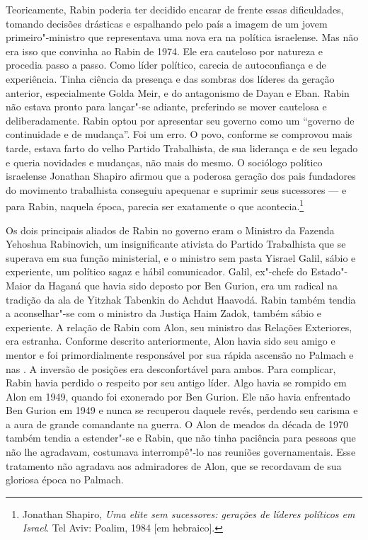 Teoricamente, Rabin poderia ter decidido encarar de frente essas
dificuldades, tomando decisões drásticas e espalhando pelo país a imagem
de um jovem primeiro"-ministro que representava uma nova era na política
israelense. Mas não era isso que convinha ao Rabin de 1974. Ele era
cauteloso por natureza e procedia passo a passo. Como líder político,
carecia de autoconfiança e de experiência. Tinha ciência da presença e
das sombras dos líderes da geração anterior, especialmente Golda Meir, e
do antagonismo de Dayan e Eban. Rabin não estava pronto para lançar"-se
adiante, preferindo se mover cautelosa e deliberadamente. Rabin optou
por apresentar seu governo como um ``governo de continuidade e de
mudança''. Foi um erro. O povo, conforme se comprovou mais tarde,
estava farto do velho Partido Trabalhista, de sua liderança e de seu
legado e queria novidades e mudanças, não mais do mesmo. O sociólogo
político israelense Jonathan Shapiro afirmou que a poderosa geração dos
pais fundadores do movimento trabalhista conseguiu apequenar e suprimir
seus sucessores --- e para Rabin, naquela época, parecia ser exatamente o
que acontecia.\footnote{Jonathan Shapiro, \emph{Uma elite sem sucessores: gerações de líderes políticos em Israel}. Tel Aviv: Poalim, 1984 {[}em hebraico{]}.}

Os dois principais aliados de Rabin no governo eram o Ministro da
Fazenda Yehoshua Rabinovich, um insignificante ativista do Partido
Trabalhista que se superava em sua função ministerial, e o ministro sem
pasta Yisrael Galil, sábio e experiente, um político sagaz e hábil
comunicador. Galil, ex"-chefe do Estado"-Maior da Haganá que havia sido
deposto por Ben Gurion, era um radical na tradição da ala de Yitzhak
Tabenkin do Achdut Haavodá. Rabin também tendia a aconselhar"-se com o
ministro da Justiça Haim Zadok, também sábio e experiente. A relação de
Rabin com Alon, seu ministro das Relações Exteriores, era estranha.
Conforme descrito anteriormente, Alon havia sido seu amigo e mentor e
foi primordialmente responsável por sua rápida ascensão no Palmach e nas
. A inversão de posições era desconfortável para ambos. Para
complicar, Rabin havia perdido o respeito por seu antigo líder. Algo
havia se rompido em Alon em 1949, quando foi exonerado por Ben Gurion.
Ele não havia enfrentado Ben Gurion em 1949 e nunca se recuperou daquele
revés, perdendo seu carisma e a aura de grande comandante na guerra. O
Alon de meados da década de 1970 também tendia a estender"-se e Rabin,
que não tinha paciência para pessoas que não lhe agradavam, costumava
interrompê"-lo nas reuniões governamentais. Esse tratamento não agradava
aos admiradores de Alon, que se recordavam de sua gloriosa época no Palmach.

